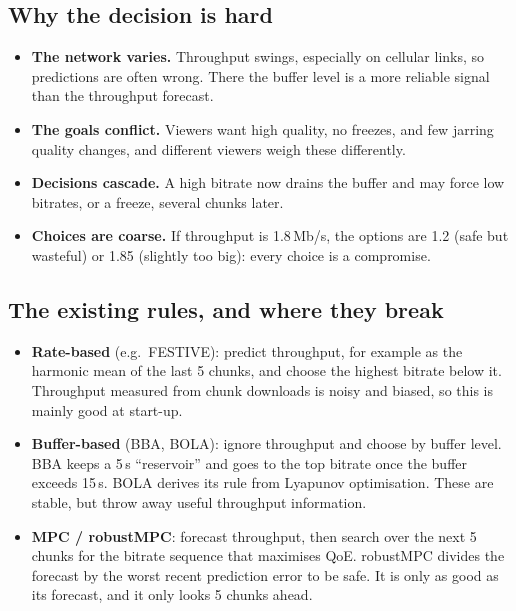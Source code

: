 \subsection{Why the decision is hard}
\begin{itemize}
  \item \textbf{The network varies.} Throughput swings, especially on cellular links, so predictions are often wrong. There the buffer level is a
        more reliable signal than the throughput forecast.
  \item \textbf{The goals conflict.} Viewers want high quality, no freezes, and few jarring quality changes, and different viewers weigh these
        differently.
  \item \textbf{Decisions cascade.} A high bitrate now drains the buffer and may force low bitrates, or a freeze, several chunks later.
  \item \textbf{Choices are coarse.} If throughput is 1.8\,Mb/s, the options are 1.2 (safe but wasteful) or 1.85 (slightly too big): every
        choice is a compromise.
\end{itemize}

\subsection{The existing rules, and where they break}
\begin{itemize}
  \item \textbf{Rate-based} (e.g.\ FESTIVE): predict throughput, for example as the harmonic mean of the last 5 chunks, and choose the highest bitrate
        below it. Throughput measured from chunk downloads is noisy and biased, so this is mainly good at start-up.
  \item \textbf{Buffer-based} (BBA, BOLA): ignore throughput and choose by buffer level. BBA keeps a 5\,s ``reservoir'' and goes to the top bitrate
        once the buffer exceeds 15\,s. BOLA derives its rule from Lyapunov optimisation. These are stable, but throw away useful throughput information.
  \item \textbf{MPC / robustMPC}: forecast throughput, then search over the next 5 chunks for the bitrate sequence that maximises QoE. robustMPC divides the
        forecast by the worst recent prediction error to be safe. It is only as good as its forecast, and it only looks 5 chunks ahead.
\end{itemize}


